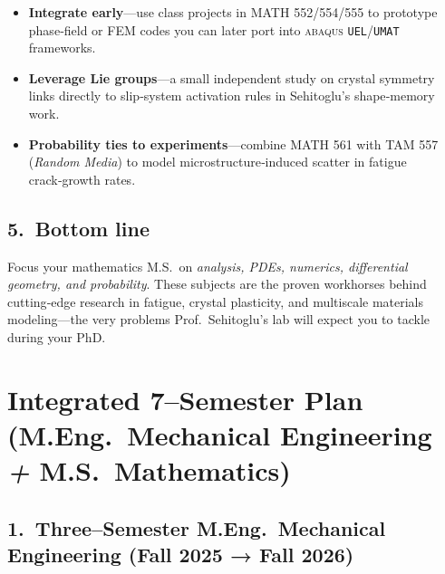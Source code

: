 \documentclass[12pt]{article}
\theoremstyle{definition} %
\theoremstyle{plain} %
\begin{document}
\begin{itemize}
  \item \textbf{Integrate early}—use class projects in MATH 552/554/555
        to prototype phase‑field or FEM codes you can later port into
        \textsc{abaqus} \texttt{UEL}/\texttt{UMAT} frameworks.
  \item \textbf{Leverage Lie groups}—a small independent study on
        crystal symmetry links directly to slip‑system activation rules
        in Sehitoglu’s shape‑memory work.
  \item \textbf{Probability ties to experiments}—combine MATH 561 with
        TAM 557 (\emph{Random Media}) to model microstructure‑induced
        scatter in fatigue crack‑growth rates.
\end{itemize}

\subsection*{5.\  Bottom line}

Focus your mathematics M.S.\ on \textit{analysis, PDEs, numerics,
differential geometry, and probability}.  
These subjects are the proven workhorses behind cutting‑edge research in
fatigue, crystal plasticity, and multiscale materials modeling—the very
problems Prof.\ Sehitoglu’s lab will expect you to tackle during your
PhD.

\section*{Integrated 7--Semester Plan\\
(M.Eng.\ Mechanical Engineering \textit{+\;} M.S.\ Mathematics)}

\subsection*{1.\ Three--Semester \textbf{M.Eng.\ Mechanical Engineering}
(Fall 2025 → Fall 2026)}
\end{document}
